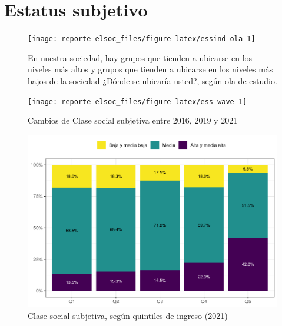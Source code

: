 \documentclass[
  12pt,
  openany]{book}
\begin{document}
\hypertarget{estatus-subjetivo}{%
\section{Estatus subjetivo}\label{estatus-subjetivo}}

\begin{figure}

{\centering \texttt{[image: reporte-elsoc\_files/figure-latex/essind-ola-1]} 

}

\caption{En nuestra sociedad, hay grupos que tienden a ubicarse en los niveles más altos y grupos que tienden a ubicarse en los niveles más bajos de la sociedad ¿Dónde se ubicaría usted?, según ola de estudio.}\label{fig:essind-ola}
\end{figure}

\begin{figure}

{\centering \texttt{[image: reporte-elsoc\_files/figure-latex/ess-wave-1]} 

}

\caption{Cambios de Clase social subjetiva entre 2016, 2019 y 2021}\label{fig:ess-wave}
\end{figure}

\begin{figure}

{\centering \includegraphics{reporte-elsoc_files/figure-latex/ess-quintil-1} 

}

\caption{Clase social subjetiva, según quintiles de ingreso (2021)}\label{fig:ess-quintil}
\end{figure}
\end{document}

